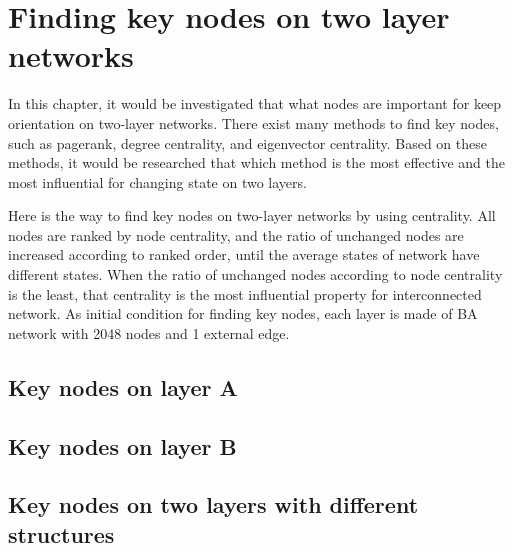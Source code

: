 
\chapter{Finding key nodes on two layer networks}
\label{chap:finding key nodes on two layer networks}
In this chapter, it would be investigated that what nodes are important for keep orientation on two-layer networks. There exist many methods to find key nodes, such as pagerank, degree centrality, and eigenvector centrality. Based on these methods, it would be researched that which method is the most effective and the most influential for changing state on two layers.  

Here is the way to find key nodes on two-layer networks by using centrality. All nodes are ranked by node centrality, and the ratio of unchanged nodes are increased according to ranked order, until the average states of network have different states. 
When the ratio of unchanged nodes according to node centrality is the least, that centrality is the most influential property for interconnected network.
As initial condition for finding key nodes, each layer is made of BA network with 2048 nodes and 1 external edge. 

\section{Key nodes on layer A}



\section{Key nodes on layer B}



\section{Key nodes on two layers with different structures}
